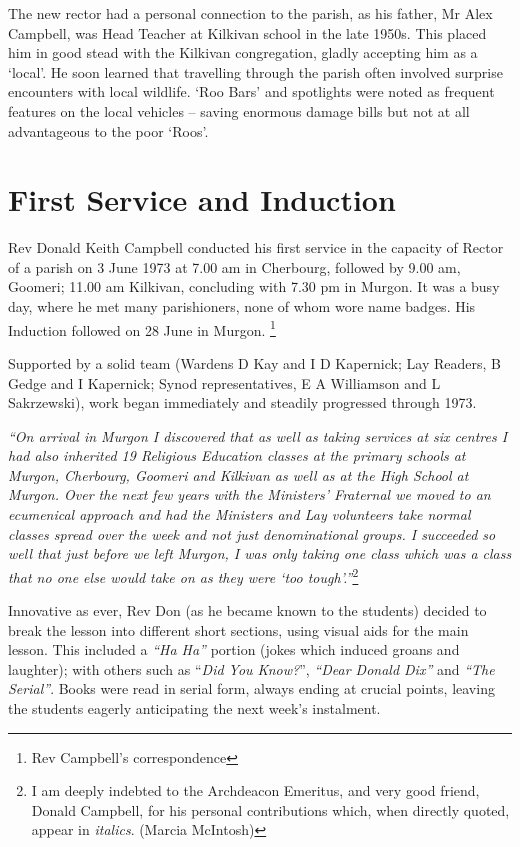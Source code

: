 The new rector had a personal connection to the parish, as his father, Mr Alex Campbell, was Head Teacher at Kilkivan school in the late 1950s. This placed him in good stead with the Kilkivan congregation, gladly accepting him as a `local'. He soon learned that travelling through the parish often involved surprise encounters with local wildlife. `Roo Bars' and spotlights were noted as frequent features on the local vehicles -- saving enormous damage bills but not at all advantageous to the poor `Roos'.

\hypertarget{first-service-and-induction}{%
\section{First Service and Induction}\label{first-service-and-induction}}

Rev Donald Keith Campbell conducted his first service in the capacity of Rector of a parish on 3 June 1973 at 7.00 am in Cherbourg, followed by 9.00 am, Goomeri; 11.00 am Kilkivan, concluding with 7.30 pm in Murgon. It was a busy day, where he met many parishioners, none of whom wore name badges. His Induction followed on 28 June in Murgon. \footnote{Rev Campbell's correspondence}

Supported by a solid team (Wardens D Kay and I D Kapernick; Lay Readers, B Gedge and I Kapernick; Synod representatives, E A Williamson and L Sakrzewski), work began immediately and steadily progressed through 1973.

\emph{``On arrival in Murgon I discovered that as well as taking services at six centres I had also inherited 19 Religious Education classes at the primary schools at Murgon, Cherbourg, Goomeri and Kilkivan as well as at the High School at Murgon. Over the next few years with the Ministers' Fraternal we moved to an ecumenical approach and had the Ministers and Lay volunteers take normal classes spread over the week and not just denominational groups. I succeeded so well that just before we left Murgon, I was only taking one class which was a class that no one else would take on as they were `too tough'.''}\footnote{I am deeply indebted to the Archdeacon Emeritus, and very good friend, Donald Campbell, for his personal contributions which, when directly quoted, appear in \emph{italics}. (Marcia McIntosh)}

Innovative as ever, Rev Don (as he became known to the students) decided to break the lesson into different short sections, using visual aids for the main lesson. This included a \emph{``Ha Ha''} portion (jokes which induced groans and laughter); with others such as ``\emph{Did You Know?}'', \emph{``Dear Donald Dix''} and \emph{``The Serial''}. Books were read in serial form, always ending at crucial points, leaving the students eagerly anticipating the next week's instalment.

